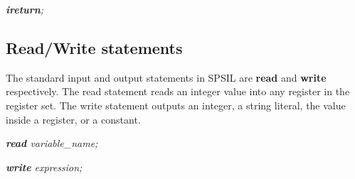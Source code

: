\documentclass[11pt]{article}
\begin{document}
\textit{\textbf{ireturn};}


\subsection{Read/Write statements}
The standard input and output statements in SPSIL are \textbf{read} and \textbf{write} respectively. The read statement reads an integer value into any register in the register set. The write statement outputs an integer, a string literal, the value inside a register, or a constant.

\textit{\textbf{read} variable\_name;}

\textit{\textbf{write} expression;}
\end{document}
